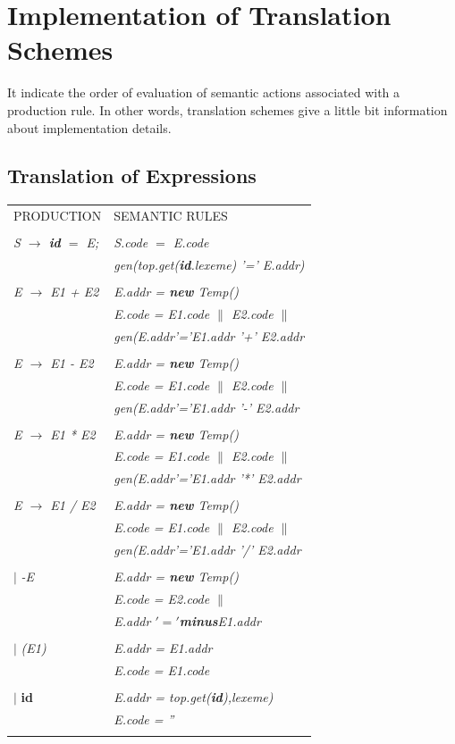 \documentclass[12pt, oneside, a4paper]{article}
\begin{document}
\section{Implementation of Translation Schemes}
It indicate the order of evaluation of semantic actions associated with a production rule. In other words, translation schemes give a little bit information about implementation details.

\subsection{Translation of Expressions}
\begin{tabular}{ll}
PRODUCTION &SEMANTIC RULES\\\\
\emph{S $\rightarrow$ \textbf{id} $=$ E;} & \emph{S.code $=$ E.code}\\
& \emph{gen(top.get(\textbf{id}.lexeme) '=' E.addr)}\\\\

\emph{E $\rightarrow$ E1 + E2}	& \emph{E.addr = \textbf{new} Temp()}\\
& \emph{E.code = E1.code $\|$ E2.code $\|$}\\
& \emph{gen(E.addr'='E1.addr '+' E2.addr}\\\\
\emph{E $\rightarrow$ E1 - E2}	& \emph{E.addr = \textbf{new} Temp()}\\
& \emph{E.code = E1.code $\|$ E2.code $\|$}\\
& \emph{gen(E.addr'='E1.addr '-' E2.addr}\\\\
\emph{E $\rightarrow$ E1 * E2}	& \emph{E.addr = \textbf{new} Temp()}\\
& \emph{E.code = E1.code $\|$ E2.code $\|$}\\
& \emph{gen(E.addr'='E1.addr '*' E2.addr}\\\\
\emph{E $\rightarrow$ E1 / E2}	& \emph{E.addr = \textbf{new} Temp()}\\
& \emph{E.code = E1.code $\|$ E2.code $\|$}\\
& \emph{gen(E.addr'='E1.addr '/' E2.addr}\\\\
$|$ \emph{-E}& \emph{E.addr = \textbf{new} Temp()}\\
&\emph{E.code = E2.code $\|$}\\
&\emph{E.addr $'='$\textbf{minus}E1.addr}\\\\
$|$ \emph{(E1)}& \emph{E.addr = E1.addr}\\
& \emph{E.code = E1.code}\\\\
$|$ \textbf{id}& \emph{E.addr = top.get(\textbf{id}),lexeme)}\\
& \emph{E.code = ''}\\\\
\end{tabular}
\end{document}
